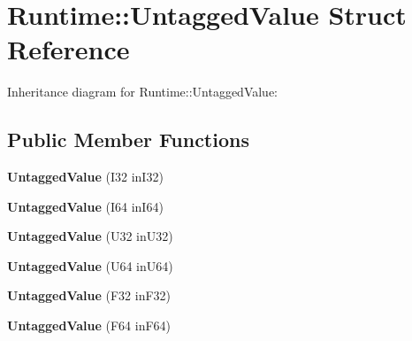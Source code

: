 \hypertarget{struct_runtime_1_1_untagged_value}{}\section{Runtime\+:\+:Untagged\+Value Struct Reference}
\label{struct_runtime_1_1_untagged_value}


Inheritance diagram for Runtime\+:\+:Untagged\+Value\+:
\subsection*{Public Member Functions}
\begin{DoxyCompactItemize}
\item 
\mbox{\label{struct_runtime_1_1_untagged_value_a080856a6800c34f881c3978c99900fe8}} 
{\bfseries Untagged\+Value} (I32 in\+I32)
\item 
\mbox{\label{struct_runtime_1_1_untagged_value_ae6b15572155321e3b09983cbdca52def}} 
{\bfseries Untagged\+Value} (I64 in\+I64)
\item 
\mbox{\label{struct_runtime_1_1_untagged_value_a47cbe52a6b372ac6428e34b8a0cf47ec}} 
{\bfseries Untagged\+Value} (U32 in\+U32)
\item 
\mbox{\label{struct_runtime_1_1_untagged_value_a04a05cb58a62c255c3acd8c8763a3b31}} 
{\bfseries Untagged\+Value} (U64 in\+U64)
\item 
\mbox{\label{struct_runtime_1_1_untagged_value_a5e3e2981b01c6e3246094c506b62204c}} 
{\bfseries Untagged\+Value} (F32 in\+F32)
\item 
\mbox{\label{struct_runtime_1_1_untagged_value_a90c75260cab90413bc7e854015fa862b}} 
{\bfseries Untagged\+Value} (F64 in\+F64)
\end{DoxyCompactItemize}
